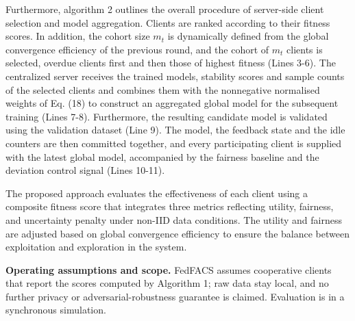 \documentclass[pdflatex,sn-mathphys-num,oneside]{sn-jnl}%
\theoremstyle{thmstyleone}%
\theoremstyle{thmstyletwo}%
\theoremstyle{thmstylethree}%
\begin{document}
Furthermore, algorithm 2 outlines the overall procedure of server-side client selection and model aggregation. Clients are ranked according to their fitness scores. In addition, the cohort size $m_t$ is dynamically defined from the global convergence efficiency of the previous round, and the cohort of $m_t$ clients is selected, overdue clients first and then those of highest fitness (Lines 3-6). The centralized server receives the trained models, stability scores and sample counts of the selected clients and combines them with the nonnegative normalised weights of Eq. (18) to construct an aggregated global model for the subsequent training (Lines 7-8). Furthermore, the resulting candidate model is validated using the validation dataset (Line 9). The model, the feedback state and the idle counters are then committed together, and every participating client is supplied with the latest global model, accompanied by the fairness baseline and the deviation control signal (Lines 10-11).


The proposed approach evaluates the effectiveness of each client using a composite fitness score that integrates three metrics reflecting utility, fairness, and uncertainty penalty under non-IID data conditions. The utility and fairness are adjusted based on global convergence efficiency to ensure the balance between exploitation and exploration in the system.

\textbf{Operating assumptions and scope.} FedFACS assumes cooperative clients that report the scores computed by Algorithm 1; raw data stay local, and no further privacy or adversarial-robustness guarantee is claimed. Evaluation is in a synchronous simulation.
\end{document}
